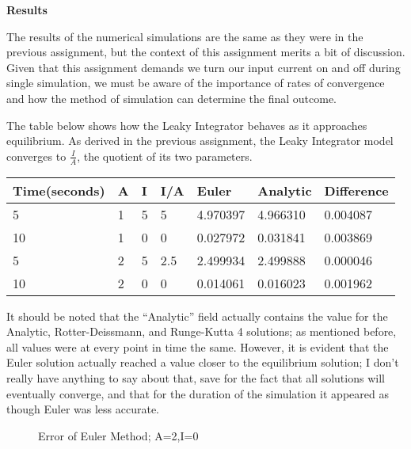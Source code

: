 \documentclass[a4paper,12pt]{article}
\begin{document}
\vfil\eject

{\bf Results}
\bigskip

The results of the numerical simulations are the same as they were in the previous assignment, but the context of this assignment merits a bit of discussion. Given that this assignment demands we turn our input current on and off during single simulation, we must be aware of the importance of rates of convergence and how the method of simulation can determine the final outcome. 

\vspace{2mm}

The table below shows how the Leaky Integrator behaves as it approaches equilibrium. As derived in the previous assignment, the Leaky Integrator model converges to $\frac{I}{A}$, the quotient of its two parameters. 

\vspace{4mm}

\begin{tabular}{ | l | l | l | l | l | l | l |}
  \hline
    Time(seconds) & A & I & I/A & Euler & Analytic & Difference \\ \hline
    5 & 1 & 5 & 5 & 4.970397 & 4.966310 & 0.004087 \\ \hline
    10 & 1 & 0 & 0 & 0.027972 & 0.031841 & 0.003869 \\ \hline
    5 & 2 & 5 & 2.5 & 2.499934 & 2.499888 & 0.000046 \\ \hline
    10 & 2 & 0 & 0 & 0.014061 & 0.016023 & 0.001962 \\ \hline
\end{tabular}

\vspace{4mm}

It should be noted that the ``Analytic'' field actually contains the value for the Analytic, Rotter-Deissmann, and Runge-Kutta 4 solutions; as mentioned before, all values were at every point in time the same. However, it is evident that the Euler solution actually reached a value closer to the equilibrium solution; I don't really have anything to say about that, save for the fact that all solutions will eventually converge, and that for the duration of the simulation it appeared as though Euler was less accurate.

\begin{figure}[h!]
\begin{center}
\end{center}
\caption{\label{pict3}Error of Euler Method; A=2,I=0}
\end{figure}
 
\end{document}
